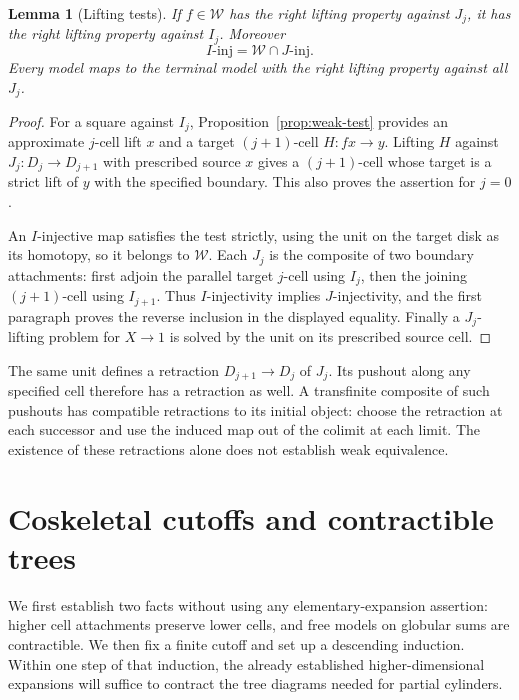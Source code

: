 \documentclass[11pt,letterpaper]{article}
\numberwithin{equation}{section}
\theoremstyle{plain}
\newtheorem{lemma}[theorem]{Lemma}
\theoremstyle{definition}
\theoremstyle{remark}
\begin{document}
\begin{lemma}[Lifting tests]\label{lem:lifting-test}
If $f\in\mathcal W$ has the right lifting property against
$J_j$, it has the right lifting property against $I_j$.
Moreover
\[
 I\text{-}\mathrm{inj}
   =\mathcal W\cap J\text{-}\mathrm{inj}.
\]
Every model maps to the terminal model with the right lifting
property against all $J_j$.
\end{lemma}

\begin{proof}
For a square against $I_j$, Proposition~\ref{prop:weak-test}
provides an approximate $j$-cell lift $x$ and a target
$(j+1)$-cell $H:fx\to y$.  Lifting $H$ against
$J_j:D_j\to D_{j+1}$ with prescribed source $x$ gives a
$(j+1)$-cell whose target is a strict lift of $y$ with the
specified boundary.  This also proves the assertion for
$j=0$.

An $I$-injective map satisfies the test strictly, using the
unit on the target disk as its homotopy, so it belongs to
$\mathcal W$.  Each $J_j$ is the composite of two boundary
attachments: first adjoin the parallel target $j$-cell using
$I_j$, then the joining $(j+1)$-cell using $I_{j+1}$.
Thus $I$-injectivity implies $J$-injectivity, and the first
paragraph proves the reverse inclusion in the displayed
equality.  Finally a $J_j$-lifting problem for $X\to1$
is solved by the unit on its prescribed source cell.
\end{proof}

The same unit defines a retraction $D_{j+1}\to D_j$ of
$J_j$.  Its pushout along any specified cell therefore has
a retraction as well.  A transfinite composite of such
pushouts has compatible retractions to its initial object:
choose the retraction at each successor and use the induced
map out of the colimit at each limit.  The existence of these
retractions alone does not establish weak equivalence.

\section{Coskeletal cutoffs and contractible trees}
\label{sec:cutoffs-trees}

We first establish two facts without using any elementary-expansion
assertion: higher cell attachments preserve lower cells, and free models
on globular sums are contractible.  We then fix a finite cutoff and set
up a descending induction.  Within one step of that induction, the
already established higher-dimensional expansions will suffice to
contract the tree diagrams needed for partial cylinders.
\end{document}
